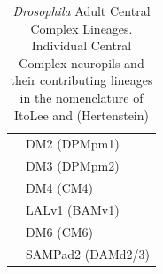 \begin{table}[ht]
\begin{tabular}{l|l}
                & DM2 (DPMpm1) \\
                & DM3 (DPMpm2) \\
                & DM4 (CM4) \\
                & LALv1 (BAMv1) \\
                & DM6 (CM6) \\
                & SAMPad2 (DAMd2/3) \\
            \bottomrule
        \end{tabular}
        \caption[\textit{Drosophila} Adult Central Complex Lineages]{\textit{Drosophila} Adult Central Complex Lineages. Individual Central Complex neuropils and their contributing lineages in the nomenclature of ItoLee\citep{lai2008clonal} and (Hertenstein)\citep{lovick2013postembryonic}}
        \label{adultlineages}
        \end{table}

    


